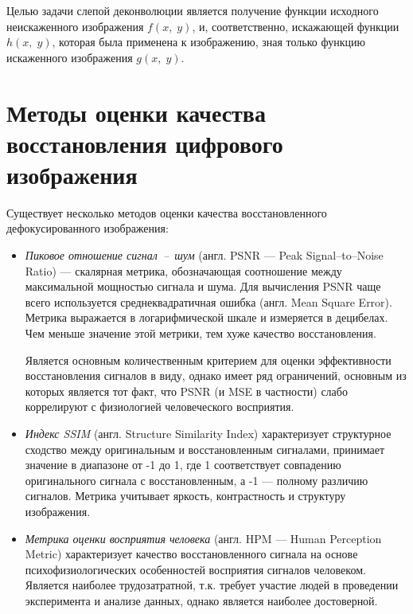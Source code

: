 Целью задачи слепой деконволюции является получение функции исходного неискаженного изображения $f(x, \;y)$, и, соответственно, искажающей функции $h(x, \;y)$, которая была применена к изображению, зная только функцию искаженного изображения $g(x, \;y)$. 

\section{Методы оценки качества восстановления цифрового изображения}

Существует несколько методов оценки качества восстановленного дефокусированного изображения:

\begin{itemize}
	\item \textit{Пиковое отношение сигнал~--~шум} (англ. PSNR --- Peak Signal--to--Noise Ratio) --- скалярная метрика, обозначающая соотношение между максимальной мощностью сигнала и шума. Для вычисления PSNR чаще всего используется среднеквадратичная ошибка (англ. Mean Square Error). Метрика выражается в логарифмической шкале и измеряется в децибелах. Чем меньше значение этой метрики, тем хуже качество восстановления. 
	
	Является основным количественным критерием для оценки эффективности восстановления сигналов в виду, однако имеет ряд ограничений, основным из которых является тот факт, что PSNR (и MSE в частности) слабо коррелируют с физиологией человеческого восприятия.
	\item \textit{Индекс SSIM }(англ. Structure Similarity Index) характеризует структурное сходство между оригинальным и восстановленным сигналами, принимает значение в диапазоне от -1 до 1, где 1 соответствует совпадению оригинального сигнала с восстановленным, а -1 --- полному различию сигналов. Метрика учитывает яркость, контрастность и структуру изображения.
	\item\textit{ Метрика оценки восприятия человека} (англ. HPM --- Human Perception Metric) характеризует качество восстановленного сигнала на основе психофизиологических особенностей восприятия сигналов человеком. Является наиболее трудозатратной, т.к. требует участие людей в проведении эксперимента и анализе данных, однако является наиболее достоверной.
\end{itemize}

%
%

